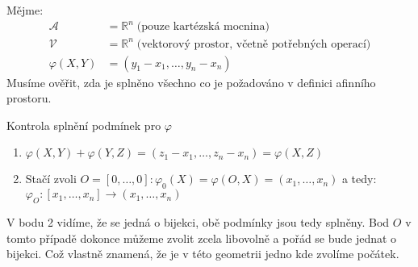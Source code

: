 \begin{example}
    Mějme:
    \begin{align*}
        \mathcal{A} &= \mathbb{R}^n\; \text{(pouze kartézská mocnina)}\\
        \mathcal{V} &= \mathbb{R}^n\; \text{(vektorový prostor, včetně potřebných operací)}\\
        \varphi(X, Y) &= (y_1 - x_1, \ldots, y_n - x_n)
    \end{align*}
    Musíme ověřit, zda je splněno všechno co je požadováno v definici afinního prostoru.

    Kontrola splnění podmínek pro $\varphi$
    \begin{enumerate}
        \item $\varphi(X, Y) + \varphi(Y, Z) = (z_1 - x_1, \ldots, z_n - x_n) = \varphi(X, Z)$
        \item Stačí zvoli $O = [0, \ldots, 0]: \varphi_0(X) = \varphi(O, X) = (x_1, \ldots, x_n)$ a tedy: $\varphi_O :[x_1, \ldots, x_n] \rightarrow (x_1, \ldots, x_n)$
    \end{enumerate}
    V bodu 2 vidíme, že se jedná o bijekci, obě podmínky jsou tedy splněny. Bod $O$ v tomto případě dokonce
    můžeme zvolit zcela libovolně a pořád se bude jednat o bijekci. Což vlastně znamená, že je v této
    geometrii jedno kde zvolíme počátek.
\end{example}

